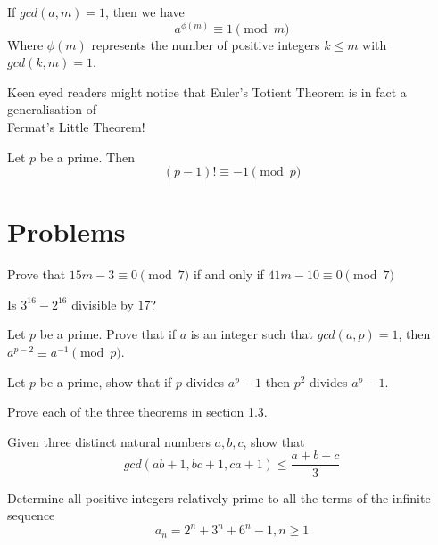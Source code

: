 \documentclass{article}
\theoremstyle{mytheoremstyle}
\theoremstyle{mytheoremstyle}
\theoremstyle{myproblemstyle}
\theoremstyle{myproblemstyle}
\theoremstyle{myproblemstyle}
\begin{document}
    \begin{theorem}
        If $gcd(a, m) = 1$, then we have $$a^{\phi(m)} \equiv 1 \pmod{m}$$ Where $\phi(m)$ represents the number of positive integers $k \leq m$ with $gcd(k, m) = 1$.
    \end{theorem}
    Keen eyed readers might notice that Euler's Totient Theorem is in fact a generalisation of \\ Fermat's Little Theorem!

    \begin{theorem}
        Let $p$ be a prime. Then $$(p-1)! \equiv -1 \pmod{p}$$
    \end{theorem}

    \pagebreak

    \section{Problems}
        \begin{problem}
            Prove that $15m - 3 \equiv 0 \pmod{7}$ if and only if $41m - 10 \equiv 0 \pmod{7}$
        \end{problem}
        \begin{problem}
            Is $3^{16} - 2^{16}$ divisible by $17$?
        \end{problem}

        \begin{problem}
            Let $p$ be a prime. Prove that if $a$ is an integer such that $gcd(a, p) = 1$, then $a^{p-2} \equiv a^{-1} \pmod{p}$.   
        \end{problem}

        \begin{problem}
            Let $p$ be a prime, show that if $p$ divides $a^p - 1$ then $p^2$ divides $a^p-1$.
        \end{problem}

        \begin{problem}
            Prove each of the three theorems in section 1.3.
        \end{problem}

        \begin{problem}[St. Petersburg 2008]
            Given three distinct natural numbers $a, b, c$, show that $$gcd(ab+1, bc + 1, ca + 1) \leq \frac{a+b+c}{3}$$
        \end{problem}

        \begin{problem}[IMO 2005 Q4]
            Determine all positive integers relatively prime to all the terms of the infinite sequence $$a_n = 2^n + 3^n + 6^n - 1, n \geq 1$$
        \end{problem}
\end{document}
